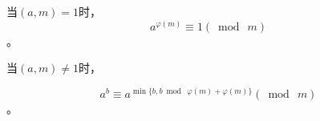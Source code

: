 当$(a,m)=1$时，
$$a^{\varphi(m)}\equiv 1(\bmod\ m)$$。

当$(a,m)\neq 1$时，

$$a^b\equiv a^{\min\{b, b \bmod\ \varphi(m)+\varphi(m)\}}(\bmod\ m)$$。